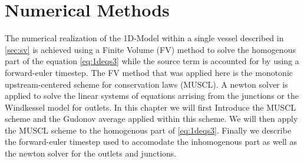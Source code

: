 \documentclass[a4paper, oneside]{discothesis}
\begin{document}
\chapter{Numerical Methods} \label{chap:nm}
The numerical realization of the 1D-Model within a single vessel described in \autoref{sec:sv} is achieved using a Finite Volume (FV) method to solve the homogenous part of the equation \autoref{eq:1deqs3} while the source term is accounted for by using a forward-euler timestep. 
The FV method that was applied here is the monotonic upstream-centered scheme for conservation laws (MUSCL).
A newton solver is applied to solve the linear systems of equations arrising from the junctions or the Windkessel model for outlets.
In this chapter we will first Introduce the MUSCL scheme and the Gudonov average applied within this scheme.
We will then apply the MUSCL scheme to the homogenous part of \autoref{eq:1deqs3}.
Finally we describe the forward-euler timestep used to accomodate the inhomogenous part as well as the newton solver for the outlets and junctions.
\end{document}
